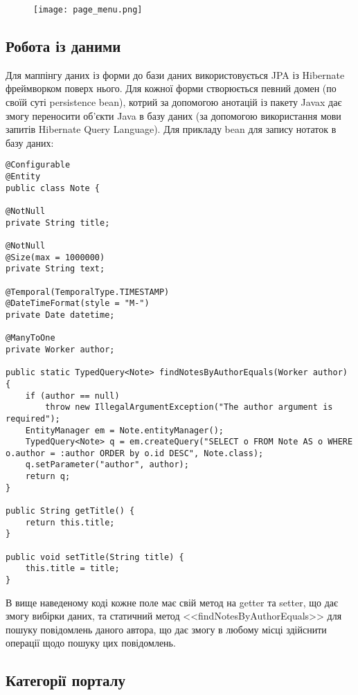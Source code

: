 \begin{figure}[!ht]
\centering
    \texttt{[image: page\_menu.png]}
    \vspace{14pt}
    \label{pic:page_menu}
\end{figure}


\subsection{Робота із даними}
\par Для маппінгу даних із форми до бази даних використовується JPA із Hibernate фреймворком поверх нього. Для кожної форми створюється певний домен (по своїй суті persistence bean), котрий за допомогою анотацій із пакету Javax дає змогу переносити об'єкти Java в базу даних (за допомогою використання мови запитів Hibernate Query Language). Для прикладу bean для запису нотаток в базу даних:
\begin{lstlisting} 
@Configurable
@Entity
public class Note {

@NotNull
private String title;

@NotNull
@Size(max = 1000000)
private String text;

@Temporal(TemporalType.TIMESTAMP)
@DateTimeFormat(style = "M-")
private Date datetime;

@ManyToOne
private Worker author;

public static TypedQuery<Note> findNotesByAuthorEquals(Worker author) {
    if (author == null)
        throw new IllegalArgumentException("The author argument is required");
    EntityManager em = Note.entityManager();
    TypedQuery<Note> q = em.createQuery("SELECT o FROM Note AS o WHERE o.author = :author ORDER by o.id DESC", Note.class);
    q.setParameter("author", author);
    return q;
}

public String getTitle() {
    return this.title;
}

public void setTitle(String title) {
    this.title = title;
}
\end{lstlisting}
\par В вище наведеному коді кожне поле має свій метод на getter та setter, що дає змогу вибірки даних, та статичний метод <<findNotesByAuthorEquals>> для пошуку повідомлень даного автора, що дає змогу в любому місці здійснити операції щодо пошуку цих повідомлень.

\subsection{Категорії порталу}
